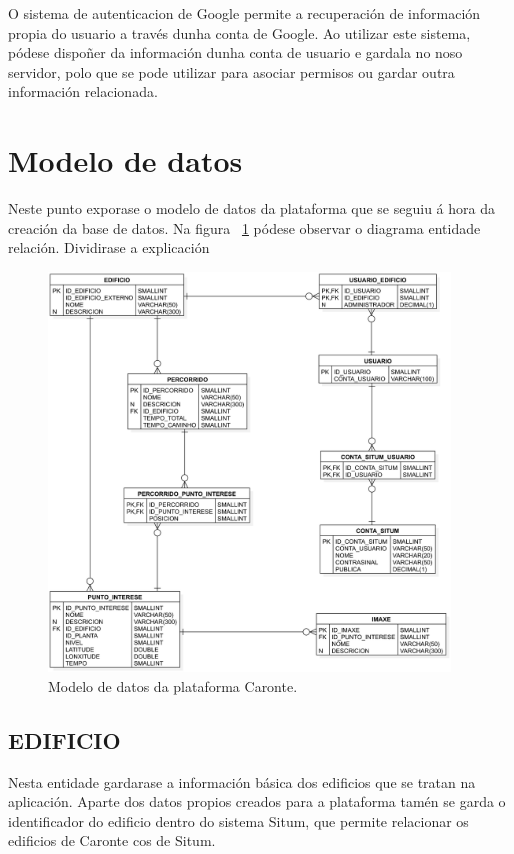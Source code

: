 O sistema de autenticacion de Google permite a recuperación de información propia do usuario a través dunha conta de Google. Ao utilizar este sistema, pódese dispoñer da información dunha conta de usuario e gardala no noso servidor, polo que se pode utilizar para asociar permisos ou gardar outra información relacionada.


\section{Modelo de datos}
Neste punto exporase o modelo de datos da plataforma que se seguiu á hora da creación da base de datos. Na figura ~\ref{fig:modelo_datos} pódese observar o diagrama entidade relación. Dividirase a explicación

\begin{figure}[tb] 
	\begin{center}
		\includegraphics[width=0.95\textwidth]{figures/BD/diagramaEntidadeRelacion}
		\caption{Modelo de datos da plataforma Caronte.}
		\label{fig:modelo_datos}
	\end{center}
\end{figure}

\subsection{EDIFICIO}
Nesta entidade gardarase a información básica dos edificios que se tratan na aplicación. Aparte dos datos propios creados para a plataforma tamén se garda o identificador do edificio dentro do sistema Situm, que permite relacionar os edificios de Caronte cos de Situm.

